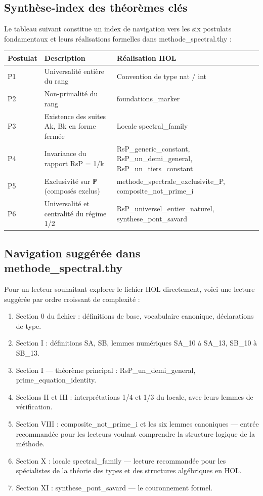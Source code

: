 \documentclass[11pt,a4paper]{article}
\begin{document}
\subsection{Synthèse-index des théorèmes clés}

Le tableau suivant constitue un index de navigation vers les six postulats fondamentaux et leurs réalisations formelles dans methode\_spectral.thy :


\begin{longtable}{|p{}|p{}|p{}|}
\hline
Postulat & Description & Réalisation HOL \\
\hline
P1 & Universalité entière du rang & Convention de type nat / int \\
\hline
P2 & Non-primalité du rang & foundations\_marker \\
\hline
P3 & Existence des suites Ak, Bk en forme fermée & Locale spectral\_family \\
\hline
P4 & Invariance du rapport RsP = 1/k & RsP\_generic\_constant, RsP\_un\_demi\_general, RsP\_un\_tiers\_constant \\
\hline
P5 & Exclusivité sur ℙ (composés exclus) & methode\_spectrale\_exclusivite\_P, composite\_not\_prime\_i \\
\hline
P6 & Universalité et centralité du régime 1/2 & RsP\_universel\_entier\_naturel, synthese\_pont\_savard \\
\hline
\end{longtable}


\subsection{Navigation suggérée dans methode\_spectral.thy}

Pour un lecteur souhaitant explorer le fichier HOL directement, voici une lecture suggérée par ordre croissant de complexité :

\begin{enumerate}[leftmargin=*]
\item Section 0 du fichier : définitions de base, vocabulaire canonique, déclarations de type.
\item Section I : définitions SA, SB, lemmes numériques SA\_10 à SA\_13, SB\_10 à SB\_13.
\item Section I — théorème principal : RsP\_un\_demi\_general, prime\_equation\_identity.
\item Sections II et III : interprétations 1/4 et 1/3 du locale, avec leurs lemmes de vérification.
\item Section VIII : composite\_not\_prime\_i et les six lemmes canoniques — entrée recommandée pour les lecteurs voulant comprendre la structure logique de la méthode.
\item Section X : locale spectral\_family — lecture recommandée pour les spécialistes de la théorie des types et des structures algébriques en HOL.
\item Section XI : synthese\_pont\_savard — le couronnement formel.
\end{enumerate}
\end{document}
